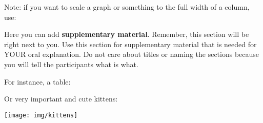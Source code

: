 \documentclass[a0paper,fleqn]{betterposter}
\begin{document}
{\vspace*{3.0em}

Note: if you want to scale a graph or something to the full width of a column, use:

\vspace*{1.0em}


}{

Here you can add \textbf{supplementary material}. Remember, this section will be
right next to you.
Use this section for supplementary material that is needed for YOUR oral
explanation. Do not care about titles or naming the sections because you will
tell the participants what is what.

\vspace*{1.0em}

For instance, a table:


\vspace*{1.0em}

Or very important and cute kittens:
\begin{center}
\texttt{[image: img/kittens]}
\end{center}

}
\end{document}

